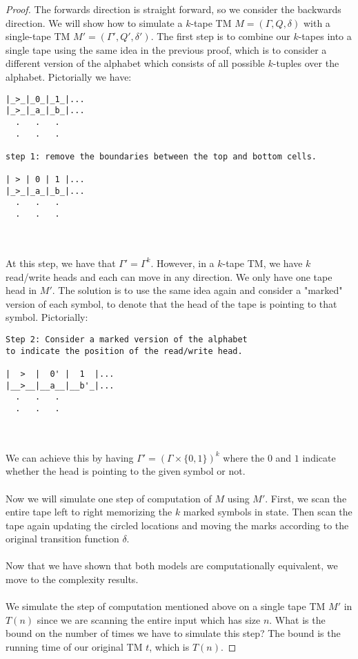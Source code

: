 \documentclass[usletter]{article}
\begin{document}
\begin{proof}
The forwards direction is straight forward, so we consider the backwards direction.
\noindent
We will show how to simulate a $k$-tape TM $M = (\Gamma, Q, \delta)$ with a single-tape TM $M' = (\Gamma', Q', \delta')$.
\noindent
The first step is to combine our $k$-tapes into a single tape using the same idea in the previous proof, which is to consider a different version of the alphabet which consists of all possible $k$-tuples over the alphabet. Pictorially we have:
\begin{verbatim}
|_>_|_0_|_1_|...
|_>_|_a_|_b_|...
  .   .   .
  .   .   .

step 1: remove the boundaries between the top and bottom cells.

| > | 0 | 1 |...
|_>_|_a_|_b_|...
  .   .   .
  .   .   .
\end{verbatim}
\\\\
At this step, we have that $\Gamma' = \Gamma^k$. However, in a $k$-tape TM, we have $k$ read/write heads and each can move in any direction. We only have one tape head in $M'$. The solution is to use the same idea again and consider a "marked" version of each symbol, to denote that the head of the tape is pointing to that symbol. Pictorially: 

\begin{verbatim}
Step 2: Consider a marked version of the alphabet 
to indicate the position of the read/write head.
 
|  >  |  0' |  1  |...
|__>__|__a__|__b'_|...
  .   .   .
  .   .   .
\end{verbatim}
\\\\
We can achieve this by having $\Gamma' = (\Gamma \times \{0, 1\})^k$ where the $0$ and $1$ indicate whether the head is pointing to the given symbol or not.
\\\\
Now we will simulate one step of computation of $M$ using $M'$.
First, we scan the entire tape left to right memorizing the $k$ marked symbols in state. Then scan the tape again updating the circled locations and moving the marks according to the original transition function $\delta$.
\\\\
Now that we have shown that both models are computationally equivalent, we move to the complexity results. 
\\\\
We simulate the step of computation mentioned above on a single tape TM $M'$ in $T(n)$ since we are scanning the entire input which has size $n$. What is the bound on the number of times we have to simulate this step? The bound is the running time of our original TM $t$, which is $T(n)$.
\end{proof}
\end{document}
